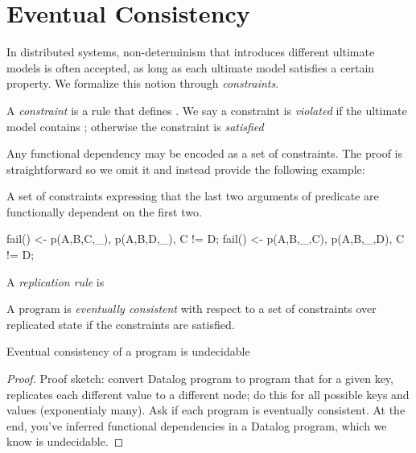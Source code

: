 \section{Eventual Consistency}

In distributed systems, non-determinism that introduces different ultimate models is often accepted, as long as each ultimate model satisfies a certain property.  We formalize this notion through {\em constraints}.

\begin{definition}
A {\em constraint} is a rule that defines .  We say a constraint is {\em violated} if the ultimate model contains ; otherwise the constraint is {\em satisfied}
\end{definition}

Any functional dependency may be encoded as a set of constraints.  The proof is straightforward so we omit it and instead provide the following example:

\begin{example}
A set of constraints expressing that the last two arguments of predicate  are functionally dependent on the first two.

\begin{Dedalus}
fail() <- p(A,B,C,_), p(A,B,D,_), C != D;
fail() <- p(A,B,_,C), p(A,B,_,D), C != D;
\end{Dedalus}
\end{example}

\begin{definition}
A {\em replication rule} is 
\end{definition}

\begin{definition}
A \lang program is {\em eventually consistent} with respect to a set of constraints over replicated state if the constraints are satisfied.
\end{definition}


\begin{lemma}
Eventual consistency of a \lang program is undecidable
\end{lemma}
\begin{proof}
Proof sketch: convert Datalog program to \lang program that for a given key, replicates each different value to a different node; do this for all possible keys and values (exponentialy many).  Ask if each program is eventually consistent.  At the end, you've inferred functional dependencies in a Datalog program, which we know is undecidable.
\end{proof}

